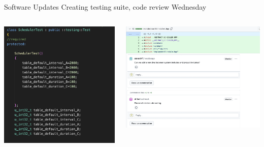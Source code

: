\begin{frame}{Software Updates}
    Creating testing suite, code review Wednesday
    \begin{columns}
        \begin{column}{0.5\textwidth}
            
            \includegraphics[height=1\textheight,width=1\textwidth,keepaspectratio]{images/testClass.png}
        \end{column}
        \begin{column}{0.5\textwidth}
            \includegraphics[height=1\textheight,width=1\textwidth,keepaspectratio]{images/commentsCodeReview.png}
        \end{column}
    \end{columns}
\end{frame}

